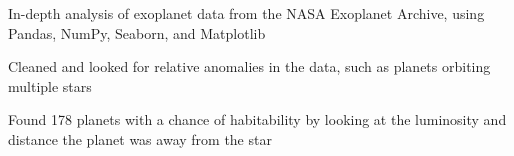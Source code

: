 \documentclass[]{resume-template}
\begin{document}
\begin{minipage}[t]{0.66\textwidth}


    \label{subsec:exo-eda}
    \begin{tightemize}
        \item In-depth analysis of exoplanet data from the NASA Exoplanet Archive, using Pandas, NumPy,
        Seaborn, and Matplotlib
        \item Cleaned and looked for relative anomalies in the data, such as planets orbiting multiple stars
        \item Found 178 planets with a chance of habitability by looking at the luminosity and distance the planet was away from the star


\end{tightemize}
\end{minipage}
\end{document}
